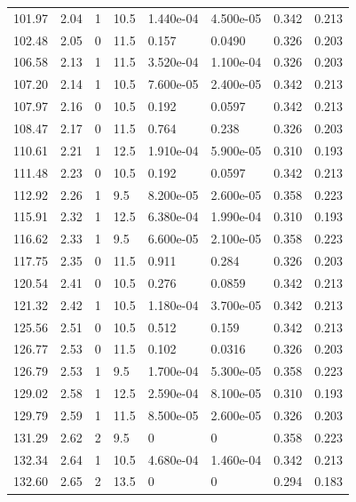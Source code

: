 \documentclass[preview]{standalone}
\begin{document}
{{{\begin{tabular}{L{1.2cm}C{1.2cm} C{0.3cm}C{0.5cm} C{1.4cm}C{1.4cm} C{1.4cm}C{1.4cm}}
  101.97  &  2.04  & 1     & 10.5 &  1.440e-04  & 4.500e-05  & 0.342 &  0.213   \\ 
  102.48  &  2.05  & 0     & 11.5 &  0.157  & 0.0490  & 0.326 &  0.203   \\ 
  106.58  &  2.13  & 1     & 11.5 &  3.520e-04  & 1.100e-04  & 0.326 &  0.203   \\ 
  107.20  &  2.14  & 1     & 10.5 &  7.600e-05  & 2.400e-05  & 0.342 &  0.213   \\ 
  107.97  &  2.16  & 0     & 10.5 &  0.192  & 0.0597  & 0.342 &  0.213   \\ 
  108.47  &  2.17  & 0     & 11.5 &  0.764  & 0.238  & 0.326 &  0.203   \\ 
  110.61  &  2.21  & 1     & 12.5 &  1.910e-04  & 5.900e-05  & 0.310 &  0.193   \\ 
  111.48  &  2.23  & 0     & 10.5 &  0.192  & 0.0597  & 0.342 &  0.213   \\ 
  112.92  &  2.26  & 1     & 9.5 &  8.200e-05  & 2.600e-05  & 0.358 &  0.223   \\ 
  115.91  &  2.32  & 1     & 12.5 &  6.380e-04  & 1.990e-04  & 0.310 &  0.193   \\ 
  116.62  &  2.33  & 1     & 9.5 &  6.600e-05  & 2.100e-05  & 0.358 &  0.223   \\ 
  117.75  &  2.35  & 0     & 11.5 &  0.911  & 0.284  & 0.326 &  0.203   \\ 
  120.54  &  2.41  & 0     & 10.5 &  0.276  & 0.0859  & 0.342 &  0.213   \\ 
  121.32  &  2.42  & 1     & 10.5 &  1.180e-04  & 3.700e-05  & 0.342 &  0.213   \\ 
  125.56  &  2.51  & 0     & 10.5 &  0.512  & 0.159  & 0.342 &  0.213   \\ 
  126.77  &  2.53  & 0     & 11.5 &  0.102  & 0.0316  & 0.326 &  0.203   \\ 
  126.79  &  2.53  & 1     & 9.5 &  1.700e-04  & 5.300e-05  & 0.358 &  0.223   \\ 
  129.02  &  2.58  & 1     & 12.5 &  2.590e-04  & 8.100e-05  & 0.310 &  0.193   \\ 
  129.79  &  2.59  & 1     & 11.5 &  8.500e-05  & 2.600e-05  & 0.326 &  0.203   \\ 
  131.29  &  2.62  & 2     & 9.5 &  0  & 0  & 0.358 &  0.223   \\ 
  132.34  &  2.64  & 1     & 10.5 &  4.680e-04  & 1.460e-04  & 0.342 &  0.213   \\ 
  132.60  &  2.65  & 2     & 13.5 &  0  & 0  & 0.294 &  0.183   \\ 

\end{tabular}}}}
\end{document}
